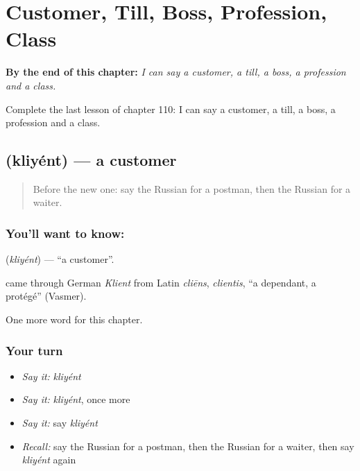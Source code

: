 
\chapter{Customer, Till, Boss, Profession, Class}
\label{ch:ru-customer-till-boss-profession-class}

\begin{chapteropening}
\textbf{By the end of this chapter:} \emph{I can say a customer, a till, a boss, a profession and a class.}

Complete the last lesson of chapter 110: I can say a customer, a till, a boss, a profession and a class.
\end{chapteropening}

\section[\texorpdfstring{\ru{клиент} (kliyént)}{клиент (kliyént)}]{ (kliyént) — a customer}

\label{lesson:RU-C110-customer}



\begin{quote}
Before the new one: say the Russian for a postman, then the Russian for a waiter.
\end{quote}

\subsection*{You'll want to know: }
\textbf{} (\emph{kliyént}) — \textquotedblleft{}a customer\textquotedblright{}.

\begin{cousinweb}
\textbf{} came through German \emph{Klient} from Latin \emph{cliēns}, \emph{clientis}, \textquotedblleft{}a dependant, a protégé\textquotedblright{} (Vasmer).
\end{cousinweb}

\begin{grammarlens}[title={What you've built}]
One more word for this chapter.
\end{grammarlens}

\subsection*{Your turn}
\begin{itemize}
\raggedright
  \item \emph{Say it:} \emph{kliyént}
  \item \emph{Say it:} \emph{kliyént}, once more
  \item \emph{Say it:} say \emph{kliyént}
  \item \emph{Recall:} say the Russian for a postman, then the Russian for a waiter, then say \emph{kliyént} again
\end{itemize}


